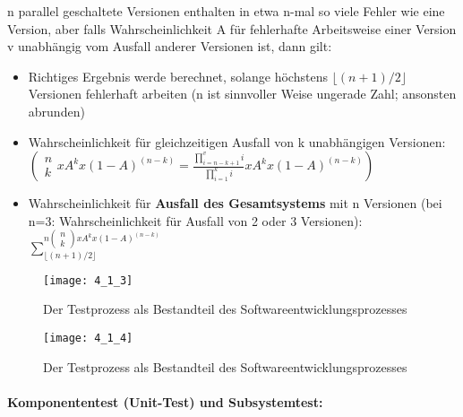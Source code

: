 n parallel geschaltete Versionen enthalten in etwa n-mal so viele Fehler wie eine Version, aber falls Wahrscheinlichkeit A für fehlerhafte Arbeitsweise einer Version v unabhängig vom Ausfall anderer Versionen ist, dann gilt:
\begin{itemize}
	\item Richtiges Ergebnis werde berechnet, solange höchstens $\lfloor(n+1)/2\rfloor$ Versionen fehlerhaft arbeiten (n ist sinnvoller Weise ungerade Zahl; ansonsten abrunden)
	\item Wahrscheinlichkeit für gleichzeitigen Ausfall von k unabhängigen Versionen: \\
	$\left(
	\begin{array}{c}
	n \\
	k
	\end{array} x A^k x (1-A)^{(n-k)} =
	\frac{\prod_{i=n-k+1}^{v}i}{\prod_{i=1}^{k}i} x A^k x (1-A)^{(n-k)}
	\right)$
	\item Wahrscheinlichkeit für \textbf{Ausfall des Gesamtsystems} mit n Versionen (bei n=3: Wahrscheinlichkeit für Ausfall von 2 oder 3 Versionen): \\
	$\sum_{\lfloor(n+1)/2\rfloor}^{n\left(
		\begin{array}{c}
		n \\
		k
		\end{array} \right) x A^k x (1-A)^{(n-k)}}$ 
\end{itemize}


\begin{figure}[h]
	\centering
	\caption{Der Testprozess als Bestandteil des Softwareentwicklungsprozesses}
	\texttt{[image: 4\_1\_3]}
\end{figure}


\begin{figure}[h]
	\centering
	\caption{Der Testprozess als Bestandteil des Softwareentwicklungsprozesses}
	\texttt{[image: 4\_1\_4]}
\end{figure}

\paragraph{Komponententest (Unit-Test) und Subsystemtest:}

